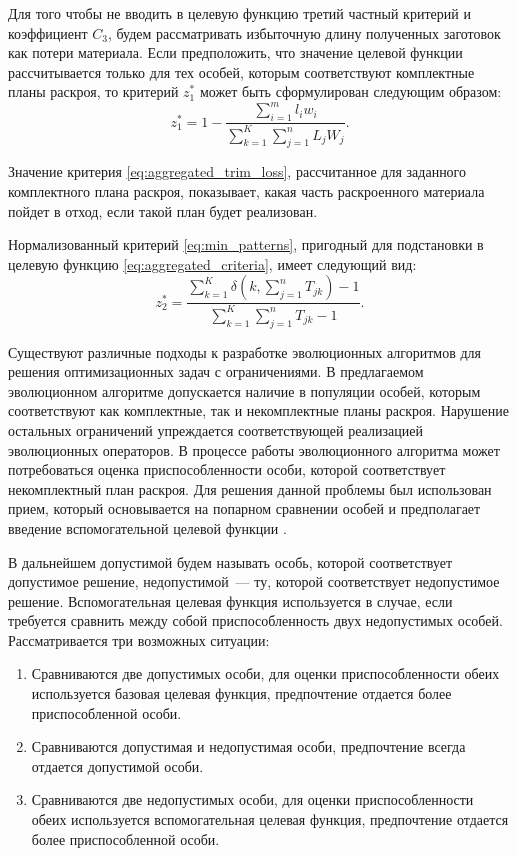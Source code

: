 \documentclass[12pt]{article}
\begin{document}
Для того чтобы не вводить в целевую функцию третий частный критерий и 
коэффициент $C_3$, будем рассматривать избыточную длину полученных заготовок 
как потери материала. Если предположить, что значение целевой функции 
рассчитывается только для тех особей, которым соответствуют комплектные планы 
раскроя, то критерий $z_1^*$ может быть сформулирован следующим образом:
\begin{equation}\label{eq:aggregated_trim_loss}
    z_1^*=1-\frac{ \sum_{i=1}^{m} l_iw_i }{ \sum_{k=1}^{K} \sum_{j=1}^{n} L_jW_j }.
\end{equation}

Значение критерия 
\eqref{eq:aggregated_trim_loss}, 
рассчитанное для заданного комплектного плана раскроя, 
показывает, какая часть раскроенного материала пойдет в отход, если такой план 
будет реализован.

Нормализованный критерий 
\eqref{eq:min_patterns}, 
пригодный для подстановки в целевую функцию 
\eqref{eq:aggregated_criteria}, 
имеет следующий вид:
\begin{equation}\label{eq:min_patterns_normalized}
    z_2^*=\frac{ \sum_{k=1}^{K} \delta\left(k, \sum_{j=1}^{n} T_{jk}\right) - 1 }
    { \sum_{k=1}^{K} \sum_{j=1}^{n} T_{jk} - 1 }.
\end{equation}

Существуют различные подходы к разработке эволюционных алгоритмов для решения 
оптимизационных задач с ограничениями. В предлагаемом эволюционном алгоритме 
допускается наличие в популяции особей, которым соответствуют как комплектные, 
так и некомплектные планы раскроя. Нарушение остальных ограничений упреждается 
соответствующей реализацией эволюционных операторов. В процессе работы 
эволюционного алгоритма может потребоваться оценка приспособленности особи, 
которой соответствует некомплектный план раскроя. Для решения данной проблемы 
был использован прием, который основывается на попарном сравнении особей и 
предполагает введение вспомогательной целевой функции 
\cite{deb00}.

В дальнейшем допустимой будем называть особь, которой соответствует допустимое 
решение, недопустимой~--- ту, которой соответствует недопустимое решение. 
Вспомогательная целевая функция используется в случае, если требуется сравнить 
между собой приспособленность двух недопустимых особей. Рассматривается три 
возможных ситуации:
\begin{enumerate}
    \item Сравниваются две допустимых особи, для оценки приспособленности 
    обеих используется базовая целевая функция, предпочтение отдается более 
    приспособленной особи.
    \item Сравниваются допустимая и недопустимая особи, предпочтение всегда 
    отдается допустимой особи.
    \item Сравниваются две недопустимых особи, для оценки приспособленности 
    обеих используется вспомогательная целевая функция, предпочтение отдается 
    более приспособленной особи.
\end{enumerate}
\end{document}
